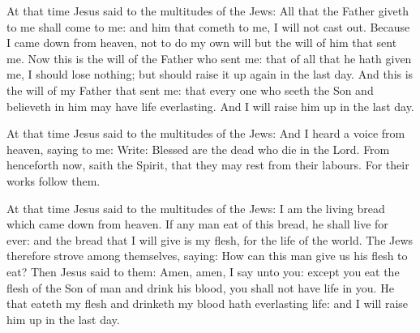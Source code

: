 
At that time Jesus said to the multitudes of the Jews:
All that the Father giveth to me shall come to me: and him that
cometh to me, I will not cast out.
Because I came down from heaven, not to do my own will but the
will of him that sent me.
Now this is the will of the Father who sent me: that of all that
he hath given me, I should lose nothing; but should raise it up again in
the last day.
And this is the will of my Father that sent me: that every one who
seeth the Son and believeth in him may have life everlasting. And I will
raise him up in the last day.






At that time Jesus said to the multitudes of the Jews:
And I heard a voice from heaven, saying to me: Write: Blessed are
the dead who die in the Lord. From henceforth now, saith the Spirit,
that they may rest from their labours. For their works follow them.




At that time Jesus said to the multitudes of the Jews:
I am the living bread which came down from heaven.
If any man eat of this bread, he shall live for ever: and the
bread that I will give is my flesh, for the life of the world.
The Jews therefore strove among themselves, saying: How can this
man give us his flesh to eat?
Then Jesus said to them: Amen, amen, I say unto you: except you
eat the flesh of the Son of man and drink his blood, you shall not have
life in you.
He that eateth my flesh and drinketh my blood hath everlasting
life: and I will raise him up in the last day.

\bigskip

